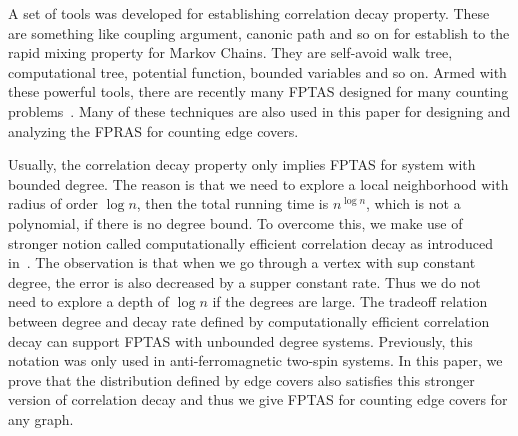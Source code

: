 A set of tools was developed for establishing correlation decay property. These are something like coupling argument, canonic path and so on for establish to the rapid mixing property for Markov Chains.
They are self-avoid walk tree, computational tree, potential function, bounded variables and so on. Armed with these powerful tools, there are recently many FPTAS designed for many counting problems~\cite{}. 
Many of these techniques are also used in this paper for designing and analyzing the FPRAS for counting edge covers.  

Usually, the correlation decay property only implies FPTAS for system with bounded degree. The reason is that
we need to explore a local neighborhood with radius of order $\log n$, then the total running time is $n^{\log n}$, which is not a polynomial, if there is no degree bound. To overcome this, we make use of stronger notion called computationally efficient correlation decay
as introduced in~\cite{LLY12}. The observation is that when we go through a vertex with sup constant degree, the error is also decreased by a supper constant rate. Thus we do not need to explore a depth of $\log n$ if the degrees are large. The tradeoff relation between degree and decay rate defined by  computationally efficient correlation decay can support FPTAS with unbounded degree systems. Previously, this notation was only used in anti-ferromagnetic two-spin systems. In this paper, we prove that the distribution defined by edge covers also satisfies this stronger version of correlation decay and thus we give FPTAS for counting edge covers for any graph.  